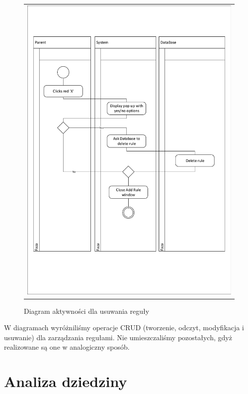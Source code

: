 \documentclass{sprawozdanie-agh}
\begin{document}
			\begin{figure}[H]
				\centering
				\begin{tabular}{c}
					\includegraphics[width=.95\textwidth]{crudDelete_cropped} 
				\end{tabular}
			\caption{Diagram aktywności dla usuwania reguły}
			\end{figure}

			W diagramach wyróżniliśmy operacje CRUD (tworzenie, odczyt, modyfikacja i usuwanie) dla zarządzania regułami. Nie umieszczaliśmy pozostałych, gdyż realizowane są one w analogiczny sposób.

	\section{Analiza dziedziny}
\end{document}

